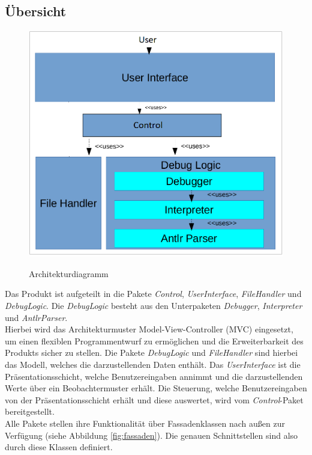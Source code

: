 \documentclass[parskip=full]{scrartcl}
\begin{document}
\subsection{Übersicht}

\begin{figure}[!h]
\centering
\includegraphics[scale=0.35]{../Plichtenheft/Architektur.png} \\
\caption{Architekturdiagramm}
\end{figure}
Das Produkt ist aufgeteilt in die Pakete \textit{Control}, \textit{UserInterface}, \textit{FileHandler} und \textit{DebugLogic}.
Die \textit{DebugLogic} besteht aus den Unterpaketen \textit{Debugger}, \textit{Interpreter} und
\textit{AntlrParser}.\\
Hierbei wird das Architekturmuster Model-View-Controller (MVC) eingesetzt, um einen flexiblen Programmentwurf zu ermöglichen und die Erweiterbarkeit des Produkts sicher zu stellen. Die Pakete \textit{DebugLogic} und \textit{FileHandler} sind hierbei das Modell, welches die darzustellenden Daten enthält. Das \textit{UserInterface} ist die Präsentationsschicht, welche Benutzereingaben annimmt und die darzustellenden Werte über ein Beobachtermuster erhält. Die Steuerung, welche Benutzereingaben von der Präsentationsschicht erhält und diese auswertet, wird vom \textit{Control}-Paket bereitgestellt. \\
Alle Pakete stellen ihre Funktionalität über Fassadenklassen nach außen zur Verfügung (siehe Abbildung \ref{fig:fassaden}). Die genauen Schnittstellen sind also durch diese Klassen definiert.
\end{document}

